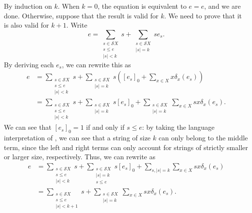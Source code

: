 \documentclass[a4paper,UKenglish,cleveref, autoref, thm-restate]{lipics-v2021}
\begin{document}
\begin{proofEnd} %
  By induction on $k$.  When $k = 0$, the equation is equivalent to $e = e$, and
  we are done.  Otherwise, suppose that the result is valid for $k$.  We need to
  prove that it is also valid for $k+1$.  Write
  \[ e =  \sum _{\substack{s  \in  \mathcal{S}X \\ s  \leq  e \\ |s| < k}} s + %
     \sum _{\substack{ s  \in  \mathcal{S}X \\ |s| = k}} se_s. \] By deriving each $e_s$, we can
  rewrite this as
  \begin{align}
    e
    & =  \sum _{\substack{s  \in  \mathcal{S}X \\ s \leq  e \\ |s| < k}} s + %
     \sum _{\substack{s  \in  \mathcal{S}X \\ |s| = k}}s\left([e_s]_0 +  \sum _{x  \in  X} x \delta _x(e_s)\right) \nonumber \\
    & =  \sum _{\substack{s  \in  \mathcal{S}X \\ s  \leq  e \\ |s| < k}} s + %
     \sum _{\substack{s  \in  \mathcal{S}X \\ |s| = k}} s[e_s]_0 + %
     \sum _{\substack{s  \in  \mathcal{S}X \\ |s|=k}} \sum _{x  \in  X}sx \delta _x(e_s).
    \label{eq:expansion-1}
  \end{align}
  We can see that $[e_s]_0 = 1$ if and only if $s  \leq  e$: by taking the language
  interpretation of , we can see that a string of size
  $k$ can only belong to the middle term, since the left and right terms can
  only account for strings of strictly smaller or larger size, respectively.
  Thus, we can rewrite  as
  \begin{align}
    e
    & =  \sum _{\substack{s  \in  \mathcal{S}X \\ s  \leq  e \\ |s| < k}} s + %
     \sum _{\substack{s  \in  \mathcal{S}X \\ |s| = k \\ s  \leq  e}} s[e_s]_0 + %
     \sum _{s, |s|=k} \sum _{x  \in  X}sx \delta _x(e_s) \nonumber \\
    & =  \sum _{\substack{s  \in  \mathcal{S}X \\ s  \leq  e \\ |s| < k+1}} s + %
     \sum _{\substack{s  \in  \mathcal{S}X \\ |s|=k}} \sum _{x  \in  X}sx \delta _x(e_s).
    \label{eq:expansion-2}
  \end{align}


\end{proofEnd}
\end{document}
